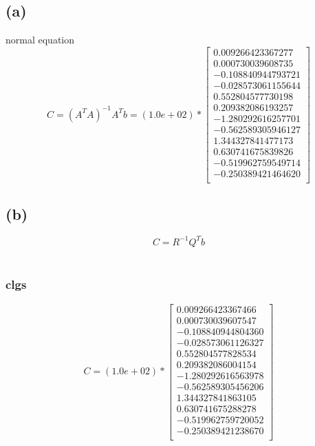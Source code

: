 \documentclass{article}
\begin{document}
        \subsection*{(a)}
            normal equation
            \[
                C = (A^TA)^{-1}A^Tb = (1.0e+02) * \left[
                \begin{array}{c}
                    0.009266423367277\\
                    0.000730039608735\\
                    -0.108840944793721\\
                    -0.028573061155644\\
                    0.552804577730198\\
                    0.209382086193257\\
                    -1.280292616257701\\
                    -0.562589305946127\\
                    1.344327841477173\\
                    0.630741675839826\\
                    -0.519962759549714\\
                    -0.250389421464620\\
                \end{array}
                \right]
            \]
        \subsection*{(b)}
                \[C = R^{-1}Q^Tb\]\\
            \subsubsection*{clgs}
            \[
                C = (1.0e+02) * \left[
                \begin{array}{c}
                    0.009266423367466\\
                    0.000730039607547\\
                    -0.108840944804360\\
                    -0.028573061126327\\
                    0.552804577828534\\
                    0.209382086004154\\
                    -1.280292616563978\\
                    -0.562589305456206\\
                    1.344327841863105\\
                    0.630741675288278\\
                    -0.519962759720052\\
                    -0.250389421238670\\
                \end{array}
                \right]
            \]
\end{document}
